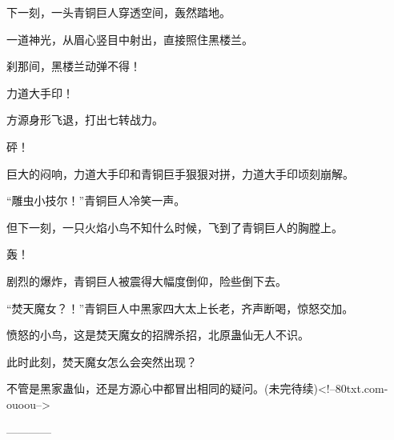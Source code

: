 \begin{this_body}
下一刻，一头青铜巨人穿透空间，轰然踏地。

一道神光，从眉心竖目中射出，直接照住黑楼兰。

刹那间，黑楼兰动弹不得！

力道大手印！

方源身形飞退，打出七转战力。

砰！

巨大的闷响，力道大手印和青铜巨手狠狠对拼，力道大手印顷刻崩解。

“雕虫小技尔！”青铜巨人冷笑一声。

但下一刻，一只火焰小鸟不知什么时候，飞到了青铜巨人的胸膛上。

轰！

剧烈的爆炸，青铜巨人被震得大幅度倒仰，险些倒下去。

“焚天魔女？！”青铜巨人中黑家四大太上长老，齐声断喝，惊怒交加。

愤怒的小鸟，这是焚天魔女的招牌杀招，北原蛊仙无人不识。

此时此刻，焚天魔女怎么会突然出现？

不管是黑家蛊仙，还是方源心中都冒出相同的疑问。(未完待续)<!--80txt.com-ouoou-->

------------

\end{this_body}

